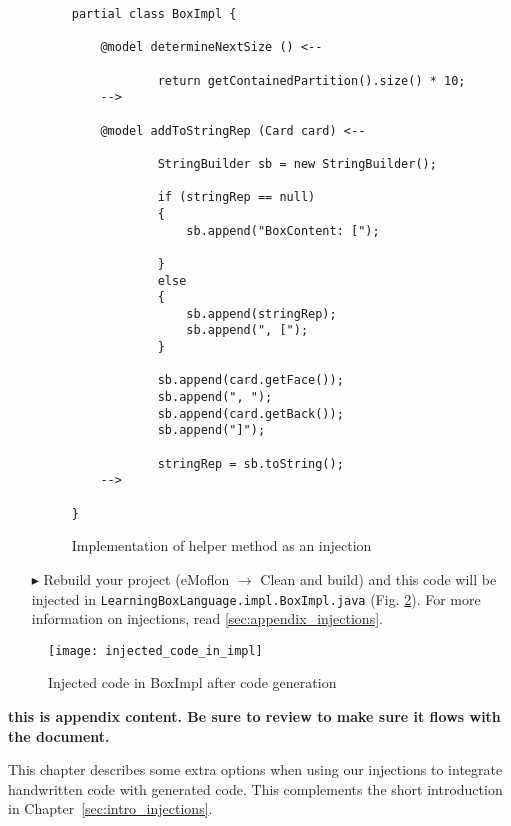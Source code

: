 \begin{enumerate}
    \begin{figure}[htbp]
        \centering
        \begin{lstlisting}[language=Injection]
partial class BoxImpl {

    @model determineNextSize () <--

            return getContainedPartition().size() * 10;
    -->

    @model addToStringRep (Card card) <--

            StringBuilder sb = new StringBuilder();

            if (stringRep == null)
            {
                sb.append("BoxContent: [");

            }
            else
            {
                sb.append(stringRep);
                sb.append(", [");
            }

            sb.append(card.getFace());
            sb.append(", ");
            sb.append(card.getBack());
            sb.append("]");

            stringRep = sb.toString();
    -->

}
        \end{lstlisting}
        \caption{Implementation of helper method as an injection}
        \label{code:complete_inject_file}
    \end{figure}
    \FloatBarrier
    \item[$\blacktriangleright$] Rebuild your project (eMoflon $\rightarrow$ Clean and build) and this code will be injected in
    \texttt{LearningBoxLanguage.impl.BoxImpl.java} (Fig. \ref{fig:injected_code_in_boxImpl}). For more information on injections, read
    \ref{sec:appendix_injections}.

\end{enumerate}



    \begin{figure}[htbp]
        \centering
        \texttt{[image: injected\_code\_in\_impl]}
        \caption{Injected code in BoxImpl after code generation}
        \label{fig:injected_code_in_boxImpl}
    \end{figure}
    
    
{\bf \large this is appendix content. Be sure to review to make sure it flows with the document.}


This chapter describes some extra options when using our injections to integrate handwritten code with generated code. 
This complements the short introduction in Chapter~\ref{sec:intro_injections}.

